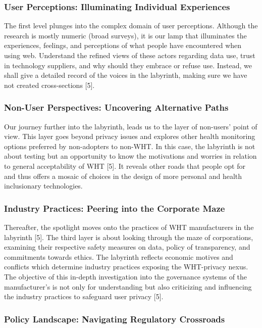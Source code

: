 \documentclass[11pt]{article}
\begin{document}
\subsubsection{User Perceptions: Illuminating Individual Experiences}

The first level plunges into the complex domain of user perceptions. Although the research is mostly numeric (broad surveys), it is our lamp that illuminates the experiences, feelings, and perceptions of what people have encountered when using web. Understand the refined views of these actors regarding data use, trust in technology suppliers, and why should they embrace or refuse use. Instead, we shall give a detailed record of the voices in the labyrinth, making sure we have not created cross-sections [5].

\subsubsection{Non-User Perspectives: Uncovering Alternative Paths}

Our journey further into the labyrinth, leads us to the layer of non-users’ point of view. This layer goes beyond privacy issues and explores other health monitoring options preferred by non-adopters to non-WHT. In this case, the labyrinth is not about testing but an opportunity to know the motivations and worries in relation to general acceptability of WHT [5]. It reveals other roads that people opt for and thus offers a mosaic of choices in the design of more personal and health inclusionary technologies.

\subsubsection{Industry Practices: Peering into the Corporate Maze}

Thereafter, the spotlight moves onto the practices of WHT manufacturers in the labyrinth [5]. The third layer is about looking through the maze of corporations, examining their respective safety measures on data, policy of transparency, and commitments towards ethics. The labyrinth reflects economic motives and conflicts which determine industry practices exposing the WHT-privacy nexus. The objective of this in-depth investigation into the governance systems of the manufacturer’s is not only for understanding but also criticizing and influencing the industry practices to safeguard user privacy [5].

\subsubsection{Policy Landscape: Navigating Regulatory Crossroads}
\end{document}
